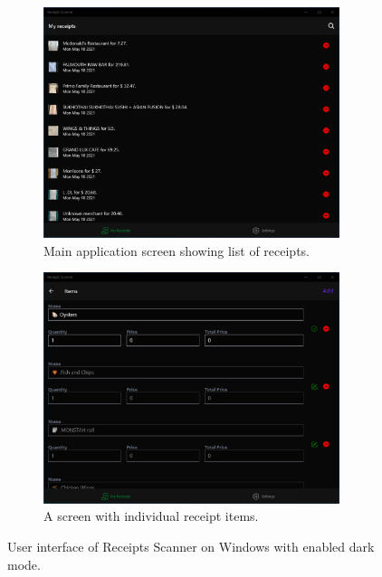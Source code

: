 \documentclass[
  digital, %
  table,   %
  oneside, %
  lof,     %
  lot,     %
]{fithesis3}
\newcommand\half{0.45}
\newcommand\subfigsize{0.95}
\begin{document}
\begin{figure}
    \centering
    \begin{subfigure}[t]{\half\textwidth}
      \centering
      \includegraphics[width=\subfigsize\textwidth]{figures/screens/windows/dark/receipts_list}
      \caption{Main application screen showing list of receipts.}
    \end{subfigure}
    \begin{subfigure}[t]{\half\textwidth}
      \centering
      \includegraphics[width=\subfigsize\textwidth]{figures/screens/windows/dark/items}
      \caption{A screen with individual receipt items.}
      \label{fig:dark_mode_windows}
    \end{subfigure}
    \caption{User interface of Receipts Scanner on Windows with enabled dark mode.}
\end{figure}
\end{document}
